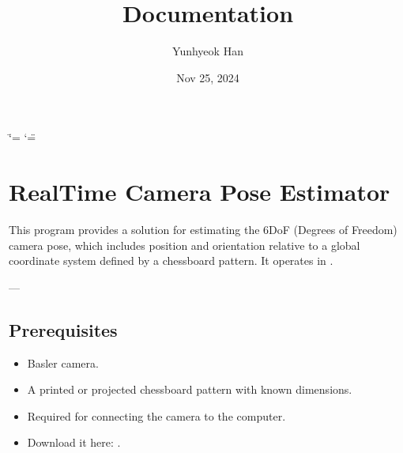 \documentclass[letterpaper,10pt,english]{sphinxmanual}
\title{Documentation}
\date{Nov 25, 2024}
\author{Yunhyeok Han}
\begin{document}
\ifdefined\shorthandoff
  \ifnum\catcode`\=\string=\active\shorthandoff{=}\fi
  \ifnum\catcode`\"=\active{}\fi
\fi

\pagestyle{empty}
\sphinxmaketitle
\pagestyle{plain}
\sphinxtableofcontents
\pagestyle{normal}
\label{\detokenize{index::doc}}


\sphinxstepscope


\chapter{Real\sphinxhyphen{}Time Camera Pose Estimator}
\label{\detokenize{introduction:real-time-camera-pose-estimator}}\label{\detokenize{introduction::doc}}
\sphinxAtStartPar
This program provides a solution for estimating the 6\sphinxhyphen{}DoF (Degrees of Freedom) camera pose, which includes position and orientation relative to a global coordinate system defined by a chessboard pattern. It operates in .

\sphinxAtStartPar
—


\section{Prerequisites}
\label{\detokenize{introduction:prerequisites}}\begin{description}
\begin{itemize}
\item {} 
\sphinxAtStartPar
{} Basler camera.

\item {} 
\sphinxAtStartPar
{} A printed or projected chessboard pattern with known dimensions.

\end{itemize}

\begin{itemize}
\item {} 
\sphinxAtStartPar
{} Required for connecting the camera to the computer.

\item {} 
\sphinxAtStartPar
Download it here: .

\end{itemize}

\end{description}
\end{document}
